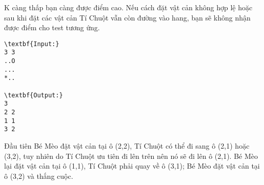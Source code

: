 K càng thấp bạn càng được điểm cao. Nếu cách đặt vật cản không hợp lệ hoặc sau khi đặt các vật cản Tí Chuột vẫn còn đường vào hang, bạn sẽ không nhận được điểm cho test tương ứng.
\begin{verbatim}
\textbf{Input:}
3 3
..O
...
*..

\textbf{Output:}
3
2 2
1 1
3 2\end{verbatim}
Đầu tiên Bé Mèo đặt vật cản tại ô (2,2), Tí Chuột có thể đi sang ô (2,1) hoặc (3,2), tuy nhiên do Tí Chuột ưu tiên đi lên trên nên nó sẽ đi lên ô (2,1). Bé Mèo lại đặt vật cản tại ô (1,1), Tí Chuột phải quay về ô (3,1); Bé Mèo đặt vật cản tại ô (3,2) và thắng cuộc.
